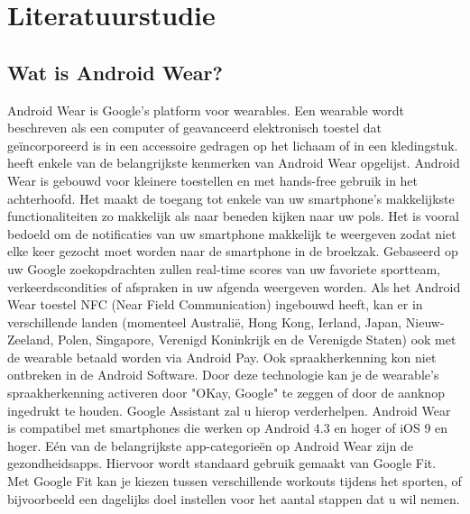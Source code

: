
\chapter{Literatuurstudie}
\label{ch:literatuurstudie}

\section{Wat is Android Wear?}
\label{sec:androidwear}
Android Wear is Google's platform voor wearables. Een wearable wordt beschreven als een computer of geavanceerd elektronisch toestel dat geïncorporeerd is in een accessoire gedragen op het lichaam of in een kledingstuk. \autocite{Dictionary}
\autocite{Techradar} heeft enkele van de belangrijkste kenmerken van Android Wear opgelijst.
Android Wear is gebouwd voor kleinere toestellen en met hands-free gebruik in het achterhoofd. Het maakt de toegang tot enkele van uw smartphone's makkelijkste functionaliteiten zo makkelijk als naar beneden kijken naar uw pols. Het is vooral bedoeld om de notificaties van uw smartphone makkelijk te weergeven zodat niet elke keer gezocht moet worden naar de smartphone in de broekzak. Gebaseerd op uw Google zoekopdrachten zullen real-time scores van uw favoriete sportteam, verkeerdscondities of afspraken in uw afgenda weergeven worden. Als het Android Wear toestel NFC (Near Field Communication) ingebouwd heeft, kan er in verschillende landen (momenteel Australië, Hong Kong, Ierland, Japan, Nieuw-Zeeland, Polen, Singapore, Verenigd Koninkrijk en de Verenigde Staten) ook met de wearable betaald worden via Android Pay. \autocite{Androidpay} Ook spraakherkenning kon niet ontbreken in de Android Software. Door deze technologie kan je de wearable's spraakherkenning activeren door "OKay, Google" te zeggen of door de aanknop ingedrukt te houden. Google Assistant zal u hierop verderhelpen. Android Wear is compatibel met smartphones die werken op Android 4.3 en hoger of iOS 9 en hoger. Eén van de belangrijkste app-categorieën op Android Wear zijn de gezondheidsapps. Hiervoor wordt standaard gebruik gemaakt van Google Fit. Met Google Fit kan je kiezen tussen verschillende workouts tijdens het sporten, of bijvoorbeeld een dagelijks doel instellen voor het aantal stappen dat u wil nemen.  
